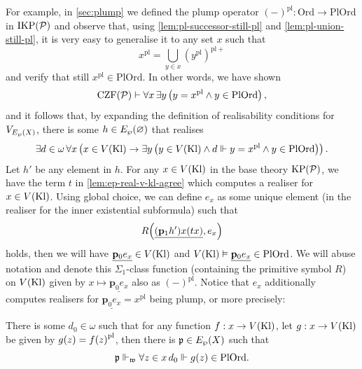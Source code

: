\documentclass[12pt,openany]{book}
\theoremstyle{plain}
\theoremstyle{definition}
\newcommand\opA[1]{\mathop{\forall #1}}
\newcommand\opE[1]{\mathop{\exists #1}}
\newcommand\Pow{\mathcal{P}}
\newcommand\KPP{\mathrm{KP}\mleft(\Pow\mright)}
\newcommand\CZFP{\mathrm{CZF}\mleft(\Pow\mright)}
\newcommand\ACg{\mathrm{AC}_\text{global}}
\newcommand\IKPP{\mathrm{IKP}\mleft(\Pow\mright)}
\newcommand\Ord{\mathrm{Ord}}
\newcommand\PlOrd{\mathrm{PlOrd}}
\newcommand\Kl{\mathrm{Kl}}
\newcommand\bp{\mathbf{p}}
\newcommand\pl{\mathrm{pl}}
\newcommand\pls{{\pl +}}
\begin{document}
For example, in \autoref{sec:plump} we defined the plump operator $\left(-\right)^\pl : \Ord \rightarrow \PlOrd$ in $\IKPP$ and observe that, using \autoref{lem:pl-successor-still-pl} and \autoref{lem:pl-union-still-pl}, it is very easy to generalise it to any set $x$ such that
\[x^\pl = \bigcup_{y \in x} \left(y^\pl\right)^\pls\]
and verify that still $x^\pl \in \PlOrd$. In other words, we have shown
\[\CZFP \vdash \opA{x} \opE{y} \left(y = x^\pl \land y \in \PlOrd\right),\]
and it follows that, by expanding the definition of realisability conditions for $V_{E_\wp\mleft(X\mright)}$, there is some $h \in E_\wp\mleft(\varnothing\mright)$ that realises
\[\opE{d \in \omega} \opA{x} \left(x \in V\mleft(\Kl\mright) \rightarrow \opE{y} \left(y \in V\mleft(\Kl\mright) \land d \Vdash y = x^\pl \land y \in \PlOrd\right)\right).\]
Let $h'$ be any element in $h$. For any $x \in V\mleft(\Kl\mright)$ in the base theory $\KPP$, we have the term $t$ in \autoref{lem:ep-real-v-kl-agree} which computes a realiser for $x \in V\mleft(\Kl\mright)$. Using global choice, we can define $e_x$ as some unique element (in the realiser for the inner existential subformula) such that
\[R\mleft(\underline{\mleft(\bp_1 h'\mright) x \mleft(tx\mright)}, e_x\mright)\]
holds, then we will have $\underline{\bp_0 e_x} \in V\mleft(\Kl\mright)$ and $V\mleft(\Kl\mright) \vDash \underline{\bp_0 e_x} \in \PlOrd$. We will abuse notation and denote this $\Sigma_1$-class function (containing the primitive symbol $R$) on $V\mleft(\Kl\mright)$ given by $x \mapsto \underline{\bp_0 e_x}$ also as $\left(-\right)^\pl$. Notice that $e_x$ additionally computes realisers for $\underline{\bp_0 e_x} = x^\pl$ being plump, or more precisely:
\begin{lemma}[$\KPP + \ACg$]
  \label{lem:pl-in-pl-ord-unif-real}
  There is some $d_0 \in \omega$ such that for any function $f : x \rightarrow V\mleft(\Kl\mright)$, let $g : x \rightarrow V\mleft(\Kl\mright)$ be given by $g\mleft(z\mright) = f\mleft(z\mright)^\pl$, then there is $\mathfrak{p} \in E_\wp\mleft(X\mright)$ such that
  \[\mathfrak{p} \Vdash_\mathfrak{w} \opA{z \in x} d_0 \Vdash g\mleft(z\mright) \in \PlOrd.\]
\end{lemma}
\end{document}

